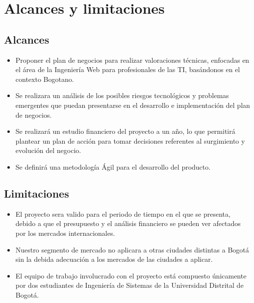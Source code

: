 \section{Alcances y limitaciones}

\subsection{Alcances}
\begin{itemize}
    \item Proponer el plan de negocios para realizar valoraciones técnicas, enfocadas en el área de la Ingeniería Web para profesionales de las TI, basándonos en el contexto Bogotano.


    \item Se realizara un análisis de los posibles riesgos tecnológicos y problemas emergentes que puedan presentarse en el desarrollo e implementación del plan de negocios.
    
    \item Se realizará un estudio financiero del proyecto a un año, lo que permitirá plantear un plan de acción para tomar decisiones referentes al surgimiento y evolución del negocio.
    
    \item Se definirá una metodología Ágil para el desarrollo del producto.
        
\end{itemize}

\subsection{Limitaciones}

\begin{itemize}
    \item El proyecto sera valido para el periodo de tiempo en el que se presenta, debido a que el presupuesto y el análisis financiero se pueden ver afectados por los mercados  internacionales.
    
    \item Nuestro segmento de mercado no aplicara a otras ciudades distintas a Bogotá sin la debida adecuación a los mercados de las ciudades a aplicar.
    
    \item El equipo de trabajo involucrado con el proyecto está compuesto únicamente por
    dos estudiantes de Ingeniería de Sistemas de la Universidad Distrital de Bogotá.
   
    
\end{itemize}
